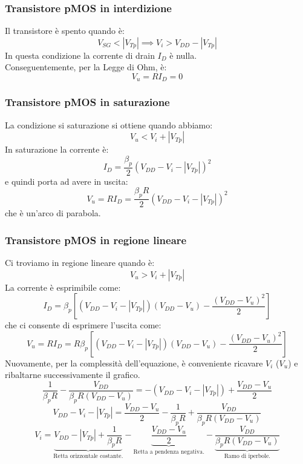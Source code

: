 \documentclass[../main.tex]{subfiles}
\begin{document}
	\subsubsection{Transistore pMOS in interdizione}
	Il transistore è spento quando è:
	$$V_{SG} < |V_{Tp}| \implies V_i > V_{DD} - |V_{Tp}|$$
	In questa condizione la corrente di drain $I_D$ è nulla.\\
	Conseguentemente, per la Legge di Ohm, è:
	$$V_u = RI_D = 0$$
	\subsubsection{Transistore pMOS in saturazione}
	La condizione si saturazione si ottiene quando abbiamo:
	$$V_u < V_i + |V_{Tp}|$$
	In saturazione la corrente è:
	$$I_D = \frac{\beta_p}{2} (V_{DD} - V_i - |V_{Tp}|)^2$$
	e quindi porta ad avere in uscita:
	$$V_u = RI_D = \frac{\beta_p R}{2} (V_{DD} - V_i - |V_{Tp}|)^2$$
	che è un'arco di parabola.
	\subsubsection{Transistore pMOS in regione lineare}
	Ci troviamo in regione lineare quando è:
	$$V_u > V_i + |V_{Tp}|$$
	La corrente è esprimibile come:
	$$I_D = \beta_p \left[ (V_{DD} - V_i - |V_{Tp}|)(V_{DD} - V_u) - \frac{(V_{DD} - V_u)^2}{2} \right]$$
	che ci consente di esprimere l'uscita come:
	$$V_u = RI_D = R\beta_p \left[ (V_{DD} - V_i - |V_{Tp}|)(V_{DD} - V_u) - \frac{(V_{DD} - V_u)^2}{2} \right]$$
	Nuovamente, per la complessità dell'equazione, è conveniente ricavare $V_i$ ($V_u$) e ribaltarne successivamente il grafico.
	$$\frac{1}{\beta_p R} - \frac{V_{DD}}{\beta_p R (V_{DD} - V_u)} = -(V_{DD} - V_i - |V_{Tp}|) + \frac{V_{DD} - V_u}{2}$$
	$$V_{DD} - V_i - |V_{Tp}| = \frac{V_{DD} - V_u}{2} - \frac{1}{\beta_p R} + \frac{V_{DD}}{\beta_p R (V_{DD} - V_u)}$$
	$$V_i = \underbrace{V_{DD} - |V_{Tp}| + \frac{1}{\beta_p R}}_{\text{Retta orizzontale costante.}} - \underbrace{\frac{V_{DD} - V_u}{2}}_{\text{Retta a pendenza negativa.}} - \underbrace{\frac{V_{DD}}{\beta_p R (V_{DD} - V_u)}}_{\text{Ramo di iperbole.}}$$
\end{document}
